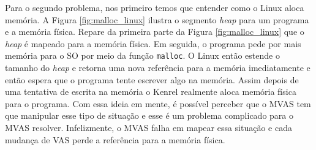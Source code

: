 
Para o segundo problema, nos primeiro temos que entender como o Linux aloca
memória. A Figura \ref{fig:malloc_linux} ilustra o segmento \emph{heap} para um
programa e a memória física. Repare da primeira parte da Figura
\ref{fig:malloc_linux} que o \emph{heap} é mapeado para a memória física. Em
seguida, o programa pede por mais memória para o SO por meio da função
\texttt{malloc}. O Linux então estende o tamanho do \emph{heap} e retorna uma
nova referência para a memória imediatamente e então espera que o programa
tente escrever algo na memória. Assim depois de uma tentativa de escrita na
memória o Kenrel realmente aloca memória física para o programa. Com essa ideia
em mente, é possível perceber que o MVAS tem que manipular esse tipo de
situação e esse é um problema complicado para o MVAS resolver. Infelizmente, o
MVAS falha em mapear essa situação e cada mudança de VAS perde a referência
para a memória física.

